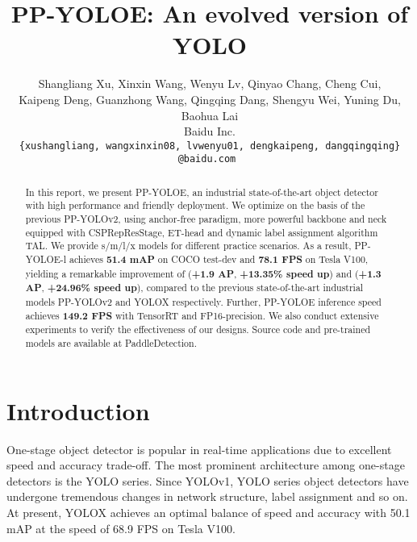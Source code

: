 \documentclass[final]{cvpr}
\begin{document}
\title{PP-YOLOE: An evolved version of YOLO}



\author{Shangliang Xu, Xinxin Wang, Wenyu Lv, Qinyao Chang, Cheng Cui, \\
Kaipeng Deng, Guanzhong Wang, Qingqing Dang, Shengyu Wei, Yuning Du, Baohua Lai \\
Baidu Inc.\\
\tt\small \{xushangliang, wangxinxin08, lvwenyu01, dengkaipeng, dangqingqing\} @baidu.com
}

\maketitle


\begin{abstract}


  In this report, we present PP-YOLOE, an industrial state-of-the-art object detector with high performance and friendly deployment. We optimize on the basis of the previous PP-YOLOv2, using anchor-free paradigm, more powerful backbone and neck equipped with CSPRepResStage, ET-head and dynamic label assignment algorithm TAL. We provide s/m/l/x models for different practice scenarios. As a result, PP-YOLOE-l achieves \textbf{51.4 mAP} on COCO test-dev and \textbf{78.1 FPS} on Tesla V100, yielding a  remarkable improvement of (\textbf{+1.9 AP}, \textbf{+13.35\% speed up}) and (\textbf{+1.3 AP}, \textbf{+24.96\% speed up}), compared to the previous state-of-the-art industrial models PP-YOLOv2 and YOLOX respectively. Further, PP-YOLOE inference speed achieves \textbf{149.2 FPS} with TensorRT and FP16-precision. We also conduct extensive experiments to verify the effectiveness of our designs. Source code and pre-trained models are available at PaddleDetection. 
  
\end{abstract}




\section{Introduction}

One-stage object detector is popular in real-time applications due to excellent speed and accuracy trade-off. The most prominent architecture among one-stage detectors is the YOLO series\cite{redmon2016you, redmon2017yolo9000, redmon2018yolov3, bochkovskiy2020yolov4, wang2021scaledyolov4, glenn_jocher_2022_6222936, ge2021yolox, long2020pp, huang2021pp-yolov2}. Since YOLOv1\cite{redmon2016you}, YOLO series object detectors have undergone tremendous changes in network structure, label assignment and so on. At present, YOLOX\cite{ge2021yolox} achieves an optimal balance of speed and accuracy with 50.1 mAP at the speed of 68.9 FPS on Tesla V100.
\end{document}
